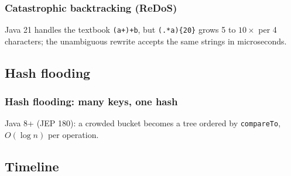 \documentclass[aspectratio=169,10pt,compress]{beamer}
\begin{document}
\begin{frame}[t,fragile] \frametitle{Catastrophic backtracking (ReDoS)}

  \vspace{0.3em}
  \small Java 21 handles the textbook \texttt{(a+)+b}, but \texttt{(.*a)\{20\}} grows 5 to $10\times$ per 4 characters;
  the unambiguous rewrite accepts the same strings in microseconds. 
\end{frame}

\subsection[Hash flood]{Hash flooding}




\begin{frame}[t,fragile] \frametitle{Hash flooding: many keys, one hash}

  \vspace{0.2em}
  \small Java 8+ (JEP 180): a crowded bucket becomes a tree ordered by \texttt{compareTo}, $O(\log n)$ per operation.
\end{frame}


\subsection[Timeline]{Timeline}
\end{document}
